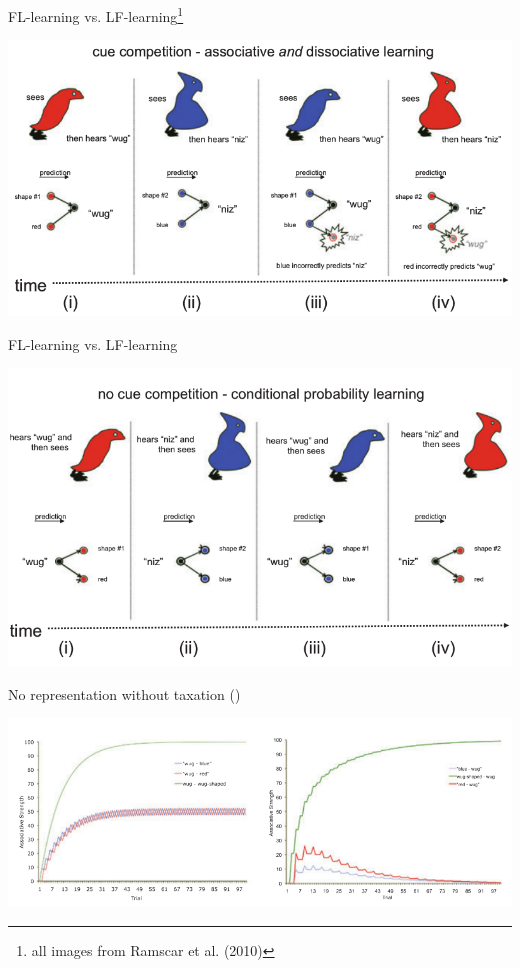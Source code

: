 \documentclass{beamer}\usepackage[]{graphicx}\usepackage[]{color}
\begin{document}
\begin{frame}{FL-learning vs. LF-learning\footnote{all images from Ramscar et al. (2010)}}
    \begin{center}
		\includegraphics[scale=.4]{figure/FL_learning.png}
	\end{center}
\end{frame}

\begin{frame}{FL-learning vs. LF-learning}
    \begin{center}
    	\includegraphics[scale=.4]{figure/LF_learning.png}
    \end{center}
\end{frame}

\begin{frame}{No representation without taxation (\cite{ramscar2009no})}
    \begin{center}
    	\includegraphics[scale=.4]{figure/representation.png}
    \end{center}
\end{frame}
\end{document}
